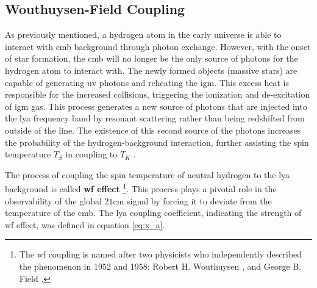 \documentclass[12pt, TexShade, letterpaper]{report}
\begin{document}
\subsection{Wouthuysen-Field Coupling}
As previously mentioned, a hydrogen atom in the early universe is able to interact with \gls{cmb} background through photon exchange. However, with the onset of star formation, the \gls{cmb} will no longer be the only source of photons for the hydrogen atom to interact with. The newly formed objects (massive stars) are capable of generating \gls{uv} photons and reheating the \gls{igm}. This excess heat is responsible for the increased collisions, triggering the ionization and de-excitation of \gls{igm} gas. This process generates a new source of photons that are injected into the \gls{lya} frequency band by resonant scattering rather than being redshifted from outside of the line. The existence of this second source of the photons increases the probability of the hydrogen-background interaction, further assisting the spin temperature $T_S$ in coupling to $T_K$ \cite{21century, low_frequency}.\par
The process of coupling the spin temperature of neutral hydrogen to the \gls{lya} background is called \textbf{\gls{wf} effect} \cite{barkana2001beginning}\footnote{The \gls{wf} coupling is named after two physicists who independently described the phenomenon in 1952 and 1958: Robert H. Wouthuysen \cite{wouthuysen_original}, and George B. Field \cite{field_original}.}. This process plays a pivotal role in the observability of the global $\mathrm{21cm}$ signal by forcing it to deviate from the temperature of the \gls{cmb}. The \gls{lya} coupling coefficient, indicating the strength of \gls{wf} effect, was defined in equation \ref{eq:x_a}. \par
\end{document}
